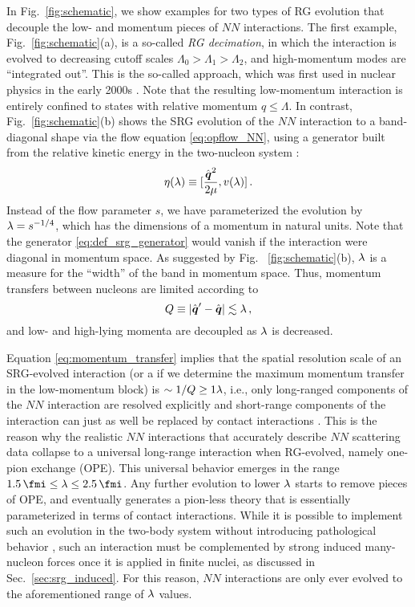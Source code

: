 In Fig.~\ref{fig:schematic}, we show examples for two types of RG evolution
that decouple the low- and momentum pieces of $NN$ interactions. The first
example, Fig.~\ref{fig:schematic}(a), is a so-called  \emph{RG decimation}, 
in which the interaction is evolved to decreasing cutoff scales $\Lambda_0 > \Lambda_1 > \Lambda_2$, 
and high-momentum modes are ``integrated out''. This is the so-called \Vlowk{}
approach, which was first used in nuclear physics in the early 2000s 
\cite{Bogner:2003os,Bogner:2010pq}. Note that the resulting low-momentum 
interaction is entirely confined to states with relative momentum $q\leq\Lambda$.
In contrast, Fig.~\ref{fig:schematic}(b) shows the SRG evolution of the $NN$ interaction
to a band-diagonal shape via the flow equation \eqref{eq:opflow_NN}, using a 
generator built from the relative kinetic energy in the two-nucleon system \cite{Bogner:2007od,Bogner:2010pq}:
\begin{equation}\label{eq:def_srg_generator}
  \eta(\lambda) \equiv \comm{\frac{\qOV^2}{2\mu}}{v(\lambda)}\,.
\end{equation}
Instead of the flow parameter $s$, we have parameterized the evolution by 
$\lambda=s^{-1/4}$, which has the dimensions of a momentum in natural units. 
Note that the generator \eqref{eq:def_srg_generator} would vanish if the
interaction were diagonal in momentum space. As suggested by Fig.~
\ref{fig:schematic}(b), $\lambda$ is a measure for the ``width'' of the 
band in momentum space. Thus, momentum transfers between nucleons are limited 
according to
\begin{equation}\label{eq:momentum_transfer}
  Q\equiv |\qOV' - \qOV| \lesssim \lambdaSRG\,,
\end{equation} 
and low- and high-lying momenta are decoupled as $\lambda$ is decreased. 

Equation \eqref{eq:momentum_transfer} implies that the spatial resolution scale
of an SRG-evolved interaction (or a \Vlowk{} if we determine the maximum
momentum transfer in the low-momentum block) is $\sim 1/Q \geq 1\lambda$,
i.e., only long-ranged components of the $NN$ interaction are resolved explicitly
and short-range components of the interaction can just as well be replaced 
by contact interactions \cite{Lepage:1997py,Bogner:2003os,Holt:2004ux,Bogner:2010pq}.
This is the reason why the realistic $NN$ interactions that accurately 
describe $NN$ scattering data collapse to a universal long-range interaction
when RG-evolved, namely one-pion exchange (OPE). This universal behavior emerges
in the range $1.5\,\fmi\leq\lambdaSRG\leq2.5\,\fmi$. Any further evolution to
lower $\lambda$ starts to remove pieces of OPE, and eventually generates a 
pion-less theory that is essentially parameterized in terms of contact 
interactions. While it is possible to implement such an evolution in
the two-body system without introducing pathological behavior \cite{Wendt:2011ys},
such an interaction must be complemented by strong induced many-nucleon
forces once it is applied in finite nuclei, as discussed in Sec.~\ref{sec:srg_induced}.
For this reason, $NN$ interactions are only ever evolved to the aforementioned
range of $\lambda$ values.

